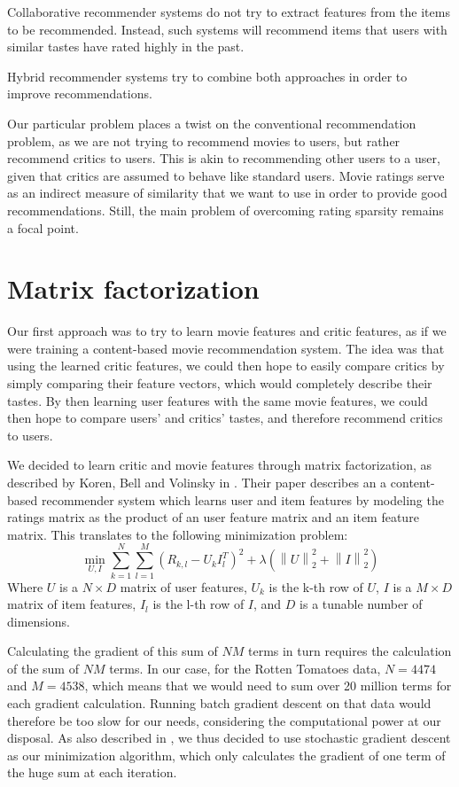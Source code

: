 \documentclass[10.5pt]{article}
\newcommand{\norm}[1]{\left\lVert#1\right\rVert}
\begin{document}
Collaborative recommender systems do not try to extract features from the items
to be recommended. Instead, such systems will recommend items that users with
similar tastes have rated highly in the past.

Hybrid recommender systems try to combine both approaches in order to improve
recommendations.

Our particular problem places a twist on the conventional recommendation
problem, as we are not trying to recommend movies to users, but rather
recommend critics to users. This is akin to recommending other users
to a user, given that critics are assumed to behave like standard users.
Movie ratings
serve as an indirect measure of similarity that we want to use in order to
provide good recommendations. Still, the main problem of overcoming rating
sparsity remains a focal point.

\section{Matrix factorization}

Our first approach was to try to learn movie features and critic features, as if
we were training a content-based movie recommendation system. The idea was that 
using the learned critic features, we could then hope to easily compare critics 
by simply comparing their feature vectors, which would completely describe 
their tastes. By then learning user features with the same movie features, we 
could then hope to compare users' and critics' tastes, and therefore recommend 
critics to users. 

We decided to learn critic and movie features through matrix factorization, as described by Koren, Bell and Volinsky in \cite{Koren09}. Their paper describes an a content-based recommender system which learns user and item features by modeling the ratings matrix as the product of an user feature matrix and an item feature matrix. This translates to the following minimization problem:
$$ \min_{U,I} \sum_{k = 1}^{N} \sum_{l = 1}^{M} (R_{k,l} - U_k I_l^T)^2 + \lambda (\norm{U}_2^2 + \norm{I}_2^2) $$
Where $U$ is a $N \times D$ matrix of user features, $U_k$ is the k-th row of $U$, $I$ is a $M \times D$ matrix of item features, $I_l$ is the l-th row of $I$, and $D$ is a tunable number of dimensions.

Calculating the gradient of this sum of $NM$ terms in turn requires the calculation of the sum of $NM$ terms. In our case, for the Rotten Tomatoes data, $N = 4474$ and $M = 4538$, which means that we would need to sum over 20 million terms for each gradient calculation. Running batch gradient descent on that data would therefore be too slow for our needs, considering the computational power at our disposal. As also described in \cite{Koren09}, we thus decided to use stochastic gradient descent as our minimization algorithm, which only calculates the gradient of one term of the huge sum at each iteration.
\end{document}

